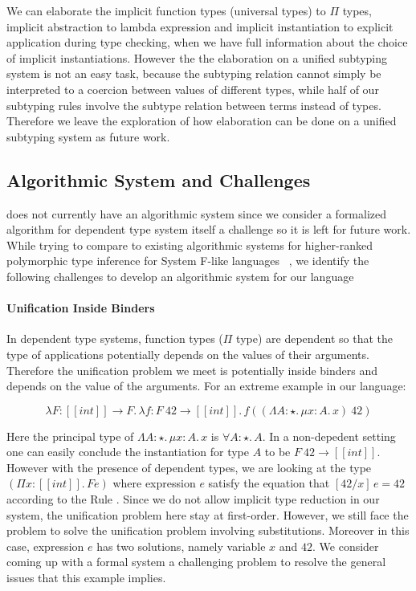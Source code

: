 We can elaborate the implicit function types (universal types) to $\Pi$ types,
implicit abstraction to lambda expression and implicit instantiation to explicit
application during type checking, when we have full information about the
choice of implicit instantiations. However the the elaboration on a unified subtyping
system is not an easy task, because the subtyping relation cannot simply be interpreted
to a coercion between values of different types, while half of our subtyping
rules involve the subtype relation between terms instead of types.
Therefore we leave the exploration of how elaboration can be done
on a unified subtyping system as future work.

\subsection{Algorithmic System and Challenges}

\name does not currently have an algorithmic system since we
consider a formalized algorithm for dependent type system itself a challenge so it
is left for future work. While trying to compare to existing algorithmic systems
for higher-ranked polymorphic type inference for System F-like languages
~\cite{dunfield2013complete,zhao19mechanical},
we identify the following challenges to develop an algorithmic system for our language

\paragraph{Unification Inside Binders}
In dependent type systems, function types ($\Pi$ type) are dependent so that
the type of applications potentially depends on the values of their arguments.
Therefore the unification problem we meet is potentially inside binders and
depends on the value of the arguments. For an extreme example in our language:

\begin{equation*}
    \lambda F : [[int]] \rightarrow F.\, \lambda f : F~42 \rightarrow [[int]].\, f ((\Lambda A : \star.\,\mu x : A.\, x)~42)
\end{equation*}

Here the principal type of $\Lambda A : \star.\,\mu x : A.\, x$ is $\forall A : \star.\, A$.
In a non-depedent setting one can easily conclude the instantiation for type $A$ to be
$F~42 \rightarrow [[int]]$. However with the presence of dependent types,
we are looking at the type $(\Pi x : [[int]].\, F e)$ where expression $e$
satisfy the equation that $[42/x]\,e = 42$ according to the Rule .
Since we do not allow implicit type reduction in our system,
the unification problem here stay at first-order. However, we still face the
problem to solve the unification problem involving substitutions.
Moreover in this case, expression $e$ has two solutions, namely variable $x$
and $42$. We consider coming up with a formal system a challenging problem to
resolve the general issues that this example implies.

